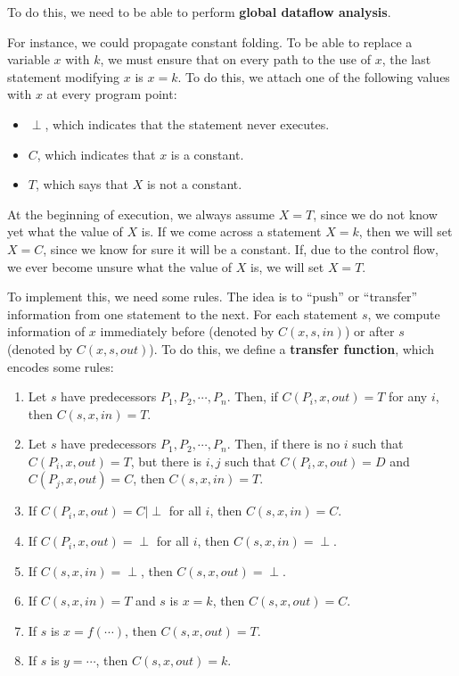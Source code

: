 \documentclass[12pt,letterpaper]{book}
\theoremstyle{definition}
\begin{document}
To do this, we need to be able to perform \textbf{global dataflow analysis}.

For instance, we could propagate constant folding. To be able to replace a variable $x$ with $k$, we must ensure that on every path to the use of $x$, the last statement modifying $x$ is $x=k$. To do this, we attach one of the following values with $x$ at every program point:
\begin{itemize}
  \item $\perp$, which indicates that the statement never executes.
  \item $C$, which indicates that $x$ is a constant.
  \item $T$, which says that $X$ is not a constant.
\end{itemize}
At the beginning of execution, we always assume $X = T$, since we do not know yet what the value of $X$ is. If we come across a statement $X=k$, then we will set $X=C$, since we know for sure it will be a constant. If, due to the control flow, we ever become unsure what the value of $X$ is, we will set $X=T$.

To implement this, we need some rules. The idea is to ``push'' or ``transfer'' information from one statement to the next. For each statement $s$, we compute information of $x$ immediately before (denoted by $C(x,s,in)$) or after $s$ (denoted by $C(x,s,out)$). To do this, we define a \textbf{transfer function}, which encodes some rules:
\begin{enumerate}
  \item Let $s$ have predecessors $P_1, P_2, \cdots, P_n$. Then, if $C(P_i,x,out) = T$ for any $i$, then $C(s,x,in) = T$.
  \item Let $s$ have predecessors $P_1, P_2, \cdots, P_n$. Then, if there is no $i$ such that $C(P_i,x,out) = T$, but there is $i,j$ such that $C(P_i,x,out)= D$ and $C(P_j,x,out) = C$, then $C(s,x,in) = T$.
  \item If $C(P_i,x,out) = C | \perp$ for all $i$, then $C(s,x,in) = C$.
  \item If $C(P_i,x,out) = \perp$ for all $i$, then $C(s,x,in) = \perp$.
  \item If $C(s,x,in) = \perp$, then $C(s,x,out) = \perp$.
  \item If $C(s,x,in) = T$ and $s$ is $x=k$, then $C(s,x,out) = C$.
  \item If $s$ is $x = f(\cdots)$, then $C(s,x,out) = T$.
  \item If $s$ is $y = \cdots$, then $C(s,x,out) = k$.
\end{enumerate}
\end{document}
